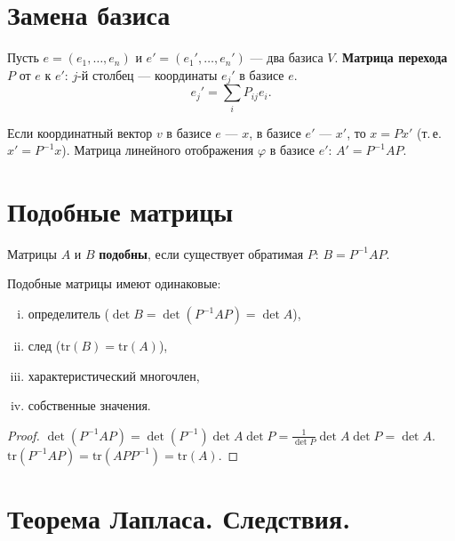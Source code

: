 \documentclass[12pt]{article}
\begin{document}
\section{Замена базиса}

\begin{definition}
Пусть $e = (e_1,\ldots,e_n)$ и $e' = (e_1',\ldots,e_n')$ --- два базиса $V$.
\textbf{Матрица перехода} $P$ от $e$ к $e'$: $j$-й столбец ---
координаты $e_j'$ в базисе $e$.
\[
e_j' = \sum_i P_{ij} e_i.
\]
\end{definition}

\begin{theorem}
Если координатный вектор $v$ в базисе $e$ --- $x$, в базисе $e'$ --- $x'$,
то $x = Px'$ (т.\,е.\ $x' = P^{-1}x$).
Матрица линейного отображения $\varphi$ в базисе $e'$:
$A' = P^{-1}AP$.
\end{theorem}

\section{Подобные матрицы}

\begin{definition}
Матрицы $A$ и $B$ \textbf{подобны}, если существует обратимая $P$:
$B = P^{-1}AP$.
\end{definition}

\begin{property}
Подобные матрицы имеют одинаковые:
\begin{enumerate}[(i)]
\item определитель ($\det B = \det(P^{-1}AP) = \det A$),
\item след ($\mathrm{tr}(B) = \mathrm{tr}(A)$),
\item характеристический многочлен,
\item собственные значения.
\end{enumerate}
\end{property}

\begin{proof}
$\det(P^{-1}AP) = \det(P^{-1})\det A\det P = \frac{1}{\det P}\det A\det P = \det A$.
$\mathrm{tr}(P^{-1}AP) = \mathrm{tr}(AP P^{-1}) = \mathrm{tr}(A)$.
\end{proof}

\section{Теорема Лапласа. Следствия.}
\end{document}
